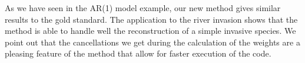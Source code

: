 As we have seen in the AR(1) model example, our new method gives similar results to the gold standard. The application to the river invasion shows that the method is able to handle well the reconstruction of a simple invasive species. We point out that the cancellations we get during the calculation of the weights are a pleasing feature of the method that allow for faster execution of the code.





